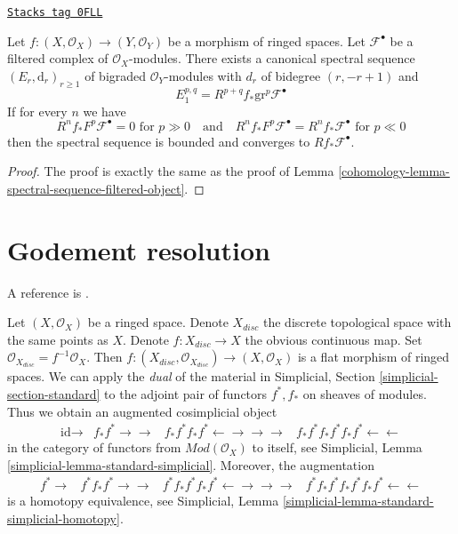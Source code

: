 \begin{lemma}
\label{cohomology-lemma-relative-spectral-sequence-filtered-object}
\href{https://stacks.math.columbia.edu/tag/0FLL}{\texttt{Stacks tag 0FLL}}

Let $f : (X, \mathcal{O}_X) \to (Y, \mathcal{O}_Y)$ be a morphism of
ringed spaces. Let $\mathcal{F}^\bullet$ be a filtered complex of
$\mathcal{O}_X$-modules. There exists a canonical spectral sequence
$(E_r, \text{d}_r)_{r \geq 1}$ of bigraded
$\mathcal{O}_Y$-modules with $d_r$ of bidegree $(r, -r + 1)$ and
$$
E_1^{p, q} = R^{p + q}f_*\text{gr}^p\mathcal{F}^\bullet
$$
If for every $n$ we have
$$
R^nf_*F^p\mathcal{F}^\bullet = 0 \text{ for }p \gg 0
\quad\text{and}\quad
R^nf_*F^p\mathcal{F}^\bullet = R^nf_*\mathcal{F}^\bullet \text{ for }p \ll 0
$$
then the spectral sequence is bounded and converges to
$Rf_*\mathcal{F}^\bullet$.
\end{lemma}

\begin{proof}

The proof is exactly the same as the proof of
Lemma \ref{cohomology-lemma-spectral-sequence-filtered-object}.
\end{proof}

\section{Godement resolution}
\label{cohomology-section-godement}
A reference is \cite{Godement}.

\medskip\noindent
Let $(X, \mathcal{O}_X)$ be a ringed space. Denote $X_{disc}$ the discrete
topological space with the same points as $X$. Denote $f : X_{disc} \to X$
the obvious continuous map. Set $\mathcal{O}_{X_{disc}} = f^{-1}\mathcal{O}_X$.
Then $f : (X_{disc}, \mathcal{O}_{X_{disc}}) \to (X, \mathcal{O}_X)$
is a flat morphism of ringed spaces. We can apply the
{\it dual} of the material in
Simplicial, Section \ref{simplicial-section-standard} to the adjoint pair of
functors $f^*, f_*$ on sheaves of modules. Thus we obtain an augmented
cosimplicial object
$$
\begin{array}{cccc}\text{id} \longrightarrow & f_*f^* \longrightarrow\longrightarrow & f_*f^*f_*f^* \longleftarrow\longrightarrow\longrightarrow\longrightarrow & f_*f^*f_*f^*f_*f^* \longleftarrow\longleftarrow\end{array}
$$
in the category of functors from $\textit{Mod}(\mathcal{O}_X)$
to itself, see Simplicial, Lemma \ref{simplicial-lemma-standard-simplicial}.
Moreover, the augmentation
$$
\begin{array}{cccc}f^* \longrightarrow & f^*f_*f^* \longrightarrow\longrightarrow & f^*f_*f^*f_*f^* \longleftarrow\longrightarrow\longrightarrow\longrightarrow & f^*f_*f^*f_*f^*f_*f^* \longleftarrow\longleftarrow\end{array}
$$
is a homotopy equivalence, see
Simplicial, Lemma \ref{simplicial-lemma-standard-simplicial-homotopy}.

